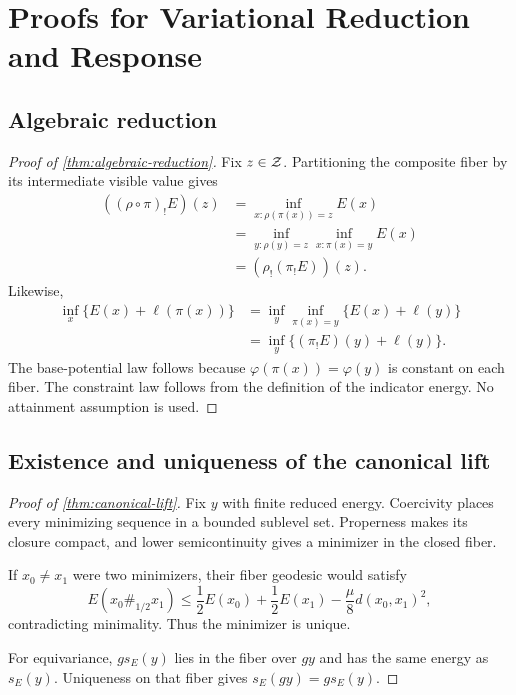 \section{Proofs for Variational Reduction and Response}
\label{app:reduction-response}

\subsection{Algebraic reduction}

\begin{proof}[Proof of \cref{thm:algebraic-reduction}]
Fix \(z\in\mathcal Z\).  Partitioning the composite fiber by its intermediate
visible value gives
\[
\begin{aligned}
  ((\rho\circ\pi)_!E)(z)
  &=\inf_{x:\rho(\pi(x))=z}E(x)\\
  &=\inf_{y:\rho(y)=z}\inf_{x:\pi(x)=y}E(x)\\
  &=(\rho_!(\pi_!E))(z).
\end{aligned}
\]
Likewise,
\[
\begin{aligned}
  \inf_x\{E(x)+\ell(\pi(x))\}
  &=\inf_y\inf_{\pi(x)=y}\{E(x)+\ell(y)\}\\
  &=\inf_y\{(\pi_!E)(y)+\ell(y)\}.
\end{aligned}
\]
The base-potential law follows because \(\varphi(\pi(x))=\varphi(y)\) is
constant on each fiber.  The constraint law follows from the definition of
the indicator energy.  No attainment assumption is used.
\end{proof}

\subsection{Existence and uniqueness of the canonical lift}

\begin{proof}[Proof of \cref{thm:canonical-lift}]
Fix \(y\) with finite reduced energy.  Coercivity places every minimizing
sequence in a bounded sublevel set.  Properness makes its closure compact, and
lower semicontinuity gives a minimizer in the closed fiber.

If \(x_0\ne x_1\) were two minimizers, their fiber geodesic would satisfy
\[
  E(x_0\#_{1/2}x_1)
  \le\frac12E(x_0)+\frac12E(x_1)
  -\frac\mu8d(x_0,x_1)^2,
\]
contradicting minimality.  Thus the minimizer is unique.

For equivariance, \(g s_E(y)\) lies in the fiber over \(gy\) and has the same
energy as \(s_E(y)\).  Uniqueness on that fiber gives
\(s_E(gy)=g s_E(y)\).
\end{proof}


